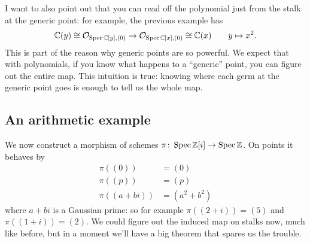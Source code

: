 \begin{remark}
	I want to also point out that you can read off the polynomial
	just from the stalk at the generic point:
	for example, the previous example has
	\[ \mathbb C(y) \cong \mathcal O_{\operatorname{Spec} \mathbb C[y], (0)}
		\to \mathcal O_{\operatorname{Spec} \mathbb C[x], (0)} \cong \mathbb C(x)
		\qquad y \mapsto x^2. \]
	This is part of the reason why generic points are so powerful.
	We expect that with polynomials,
	if you know what happens to a ``generic'' point,
	you can figure out the entire map.
	This intuition is true:
	knowing where each germ at the generic point goes
	is enough to tell us the whole map.
\end{remark}

\subsection{An arithmetic example}
\begin{example}
	[{$\Spec \ZZ[i] \to \Spec \ZZ$}]
	We now construct a morphism of schemes
	$\pi \colon \operatorname{Spec} \mathbb Z[i] \to \operatorname{Spec} \mathbb Z$.
	On points it behaves by
	\begin{align*}
		\pi\left( (0) \right) &= (0) \\
		\pi\left( (p) \right) &= (p) \\
		\pi\left( (a+bi) \right) &= (a^2+b^2)
	\end{align*}
	where $a+bi$ is a Gaussian prime:
	so for example $\pi( (2+i) ) = (5)$ and $\pi( (1+i) ) = (2)$.
	We could figure out the induced map on stalks now,
	much like before, but in a moment we'll have a big theorem
	that spares us the trouble.
\end{example}


